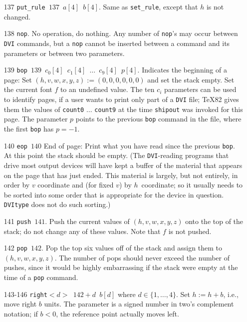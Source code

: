\documentclass[10pt, a4paper]{article}
\begin{document}
\begin{itemize}
\item[137] \texttt{put\_rule $137$ $a[4]$ $b[4]$}. 
Same as \texttt{set\_rule}, except that $h$ is not changed. 

\item[138] \texttt{nop}. 
No operation, do nothing. Any number of \texttt{nop}'s
may occur between \texttt{DVI} commands, 
but a \texttt{nop} cannot be inserted 
between a command and its parameters or between two parameters. 

\item[139] \texttt{bop $139$ $c_0[4]$ $c_1[4]$ $\ldots$ $c_9[4]$ $p[4]$}. 
Indicates the beginning of a page: 
Set $(h,v,w,x,y,z):=(0,0,0,0,0,0)$ and set the stack empty. 
Set the current font $f$ to an undefined value.  
The ten $c_i$ parameters can be used to identify pages, 
if a user wants to print only part of a \texttt{DVI} file; 
\TeX82 gives them the values of \texttt{count0} $\ldots$ \texttt{count9} 
at the time \texttt{shipout} was invoked for this page.  
The parameter $p$ points to the previous \texttt{bop} command in the file, 
where the first \texttt{bop} has $p=-1$.

\item[140] \texttt{eop $140$} 
End of page: 
Print what you have read since the previous \texttt{bop}. 
At this point the stack should be empty. 
(The \texttt{DVI}-reading programs that drive most output devices 
will have kept a buffer of the material 
that appears on the page that has just ended. 
This material is largely, but not entirely, 
in order by $v$ coordinate and (for fixed $v$) by $h$~coordinate; 
so it usually needs to be sorted into some order that is
appropriate for the device in question. 
\texttt{DVItype} does not do such sorting.)


\item[141] \texttt{push $141$}. 
Push the current values of $(h,v,w,x,y,z)$ onto the top of the stack; 
do not change any of these values. Note that $f$ is not pushed. 


\item[142] \texttt{pop $142$}. 
Pop the top six values off of the stack and assign them to $(h,v,w,x,y,z)$. 
The number of pops should never exceed the number of pushes, 
since it would be highly embarrassing if the stack were empty 
at the time of a \texttt{pop} command.

\item[143-146] \texttt{right$<d>$ $142+d$ $b[d]$} where $d\in\{1,\dots,4\}$. 
Set $h:=h+b$, i.e., move right $b$ units.
The parameter is a signed number in two's complement notation; 
if $b<0$, the reference point actually moves left.


\end{itemize}
\end{document}
